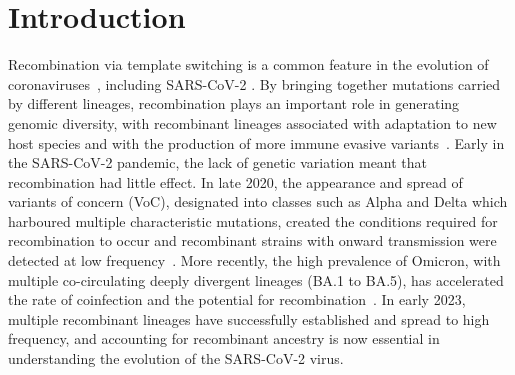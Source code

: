 \documentclass{article}
\begin{document}
\section{Introduction}
Recombination via template switching is a common feature
in the evolution of coronaviruses~\citep{Graham2010-xe,De_Klerk2022-tt},
including SARS-CoV-2
\citep{VanInsberghe2021-eu,Jackson2021-ik,Ignatieva2021-rg}. By bringing
together mutations carried by different lineages, recombination plays an
important role in generating genomic diversity, with recombinant lineages
associated with adaptation to new host species and with the production of more
immune evasive variants~\citep{Graham2010-xe,De_Klerk2022-tt}.
Early in the SARS-CoV-2 pandemic, the lack of genetic variation
meant that recombination had little effect.
In late 2020, the appearance and
spread of variants of concern (VoC), designated into classes such as Alpha and
Delta which harboured multiple characteristic mutations,
created the conditions required for recombination to occur
and recombinant strains with onward transmission were detected at
low frequency~\citep{Jackson2021-ik}.
More recently, the high prevalence of Omicron,
with multiple co-circulating deeply divergent lineages (BA.1 to BA.5), has
accelerated the rate of coinfection and the potential for
recombination~\citep{Bal2022-hq}.
In early 2023, multiple recombinant lineages have successfully
established and spread to high frequency, and accounting for recombinant
ancestry is now essential in understanding the evolution of the SARS-CoV-2
virus.
\end{document}
